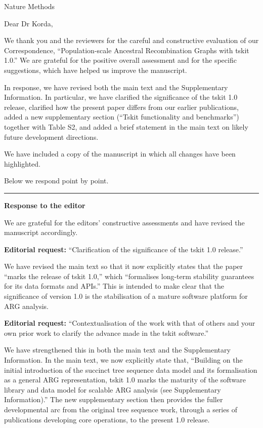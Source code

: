 \documentclass{letter}
\begin{document}
\begin{letter}{Nature Methods}

\opening{Dear Dr Korda,}

We thank you and the reviewers for the careful and constructive evaluation of
our Correspondence, ``Population-scale Ancestral Recombination Graphs with
tskit 1.0.'' We are grateful for the positive overall assessment and for the
specific suggestions, which have helped us improve the manuscript.

In response, we have revised both the main text and the Supplementary
Information. In particular, we have clarified the significance of the tskit 1.0
release, clarified how the present paper differs from our earlier publications,
added a new supplementary section (``Tskit functionality and benchmarks'')
together with Table S2, and added a brief statement in the main text on likely
future development directions.

We have included a copy of the manuscript in which all changes have been
highlighted.

Below we respond point by point.

\medskip
\hrule
\medskip

\noindent \textbf{Response to the editor}

We are grateful for the editors’ constructive assessments
and have revised the manuscript accordingly.

\noindent \textbf{Editorial request:} ``Clarification of the significance of the tskit 1.0 release.''

We have revised the main text so that it now explicitly states that
the paper ``marks the release of tskit 1.0,'' which ``formalises long-term
stability guarantees for its data formats and APIs.'' This is intended to make
clear that the significance of version 1.0 is the stabilisation of a mature
software platform for ARG analysis.

\noindent \textbf{Editorial request:} ``Contextualisation of the work with that
of others and your own prior work to clarify the advance made in the tskit
software.''

We have strengthened this in both the main text and the Supplementary
Information. In the main text, we now explicitly state that, ``Building on the
initial introduction of the succinct tree sequence data model and its
formalisation as a general ARG representation, tskit 1.0 marks the maturity
of the software library and data model for scalable ARG analysis (see
Supplementary Information).'' The new supplementary section then provides the
fuller developmental arc from the original tree sequence work, through
a series of publications developing core operations, to the present 1.0 release.


\end{letter}
\end{document}
